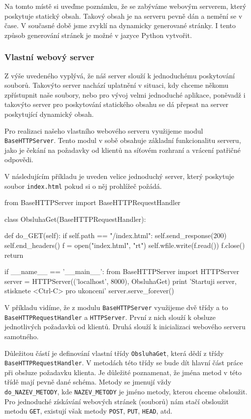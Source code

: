 Na tomto místě si uveďme poznámku, že se zabýváme webovým serverem, který poskytuje statický obsah. Takový obsah je na serveru pevně dán a nemění se v čase. V současné době jsme zvyklí na dynamicky generované stránky. I tento způsob generování stránek je možné v jazyce Python vytvořit.

\subsubsection{Vlastní webový server}
Z výše uvedeného vyplývá, že náš server slouží k jednoduchému poskytování souborů. Takovýto server nachází uplatnění v situaci, kdy chceme někomu zpřístupnit naše soubory, nebo pro vývoj velmi jednoduché aplikace, poněvadž i takovýto server pro poskytování statického obsahu se dá přepsat na server poskytující dynamický obsah.

Pro realizaci našeho vlastního webového serveru využijeme modul\\ \texttt{BaseHTTPServer}. Tento modul v sobě obsahuje základní funkcionalitu serveru, jako je čekání na požadavky od klientů na síťovém rozhraní a vrácení patřičné odpovědi.

V následujícím příkladu je uveden velice jednoduchý server, který poskytuje soubor \texttt{index.html} pokud si o něj prohlížeč požádá.

\begin{python}
from BaseHTTPServer import BaseHTTPRequestHandler

class ObsluhaGet(BaseHTTPRequestHandler):
    
    def do_GET(self):
        if self.path == "/index.html":
            self.send_response(200)
            self.end_headers()
            f = open("index.html", "rt")
            self.wfile.write(f.read())
            f.close()
        return

if __name__ == '__main__':
    from BaseHTTPServer import HTTPServer
    server = HTTPServer(('localhost', 8000), ObsluhaGet)
    print 'Startuji server, stisknete <Ctrl-C> pro ukonceni'
    server.serve_forever()
\end{python}

V příkladu vidíme, že z modulu \texttt{BaseHTTPServer} využijeme dvě třídy a to \texttt{BaseHTTPRequestHandler} a \texttt{HTTPServer}. První z nich slouží k obsluze jednotlivých požadavků od klientů. Druhá slouží k inicializaci webového serveru samotného.

Důležitou částí je definování vlastní třídy \texttt{ObsluhaGet}, která dědí z třídy \texttt{BaseHTTPRequestHandler}. V metodách této třídy se bude dít hla\-vní část práce při obsluze požadavku klienta. Je důležité poznamenat, že jména metod v této třídě mají pevně dané schéma. Metody se jmenují vždy\\ \texttt{do\_NAZEV\_METODY}, kde \texttt{NAZEV\_METODY} je jméno metody, kterou chceme obsloužit. Pro jednoduché získávání webových stránek (souborů) nám stačí obsloužit metodu \texttt{GET}, existují však metody \texttt{POST}, \texttt{PUT}, \texttt{HEAD}, atd.

